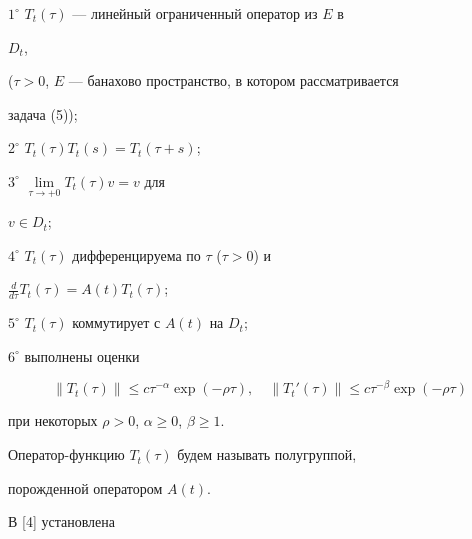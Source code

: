 $1^\circ$ $T_t(\tau)$ --- линейный ограниченный оператор из $E$ в


$D_t$,


($\tau>0$, $E$ --- банахово пространство, в котором рассматривается


задача (5));





$2^\circ$ $T_t(\tau)T_t(s)=T_t(\tau+s)$;





$3^\circ$ $\lim\limits_{\tau\to+0}T_t(\tau)v=v$ для


$v\in D_t$;





$4^\circ$ $T_t(\tau)$ дифференцируема по $\tau$ ($\tau>0$) и


$\frac{d}{d\tau}T_t(\tau)=A(t)T_t(\tau)$;





$5^\circ$ $T_t(\tau)$ коммутирует с $A(t)$ на $D_t$;





$6^\circ$ выполнены оценки


\begin{equation}


\|T_t(\tau)\|\le c\tau^{-\alpha}\exp(-\rho\tau),\quad


\|T_t'(\tau)\|\le c\tau^{-\beta}\exp(-\rho\tau)


\end{equation}


при некоторых $\rho>0$, $\alpha\ge 0$, $\beta\ge 1$.





Оператор-функцию $T_t(\tau)$ будем называть полугруппой,


порожденной оператором $A(t)$.





В [4] установлена





